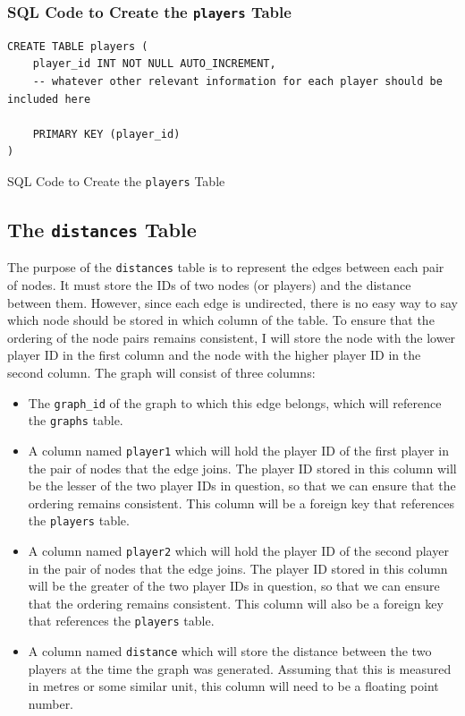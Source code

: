\documentclass[a4paper,11pt]{article}
\newenvironment{code}{\captionsetup{type=listing}}{}
\begin{document}
\subsubsection{SQL Code to Create the \texttt{players} Table}
\begin{code}
\begin{verbatim}
CREATE TABLE players (
    player_id INT NOT NULL AUTO_INCREMENT,
    -- whatever other relevant information for each player should be included here

    PRIMARY KEY (player_id)
)
\end{verbatim}
\caption{SQL Code to Create the \texttt{players} Table}
\end{code}

\subsection{The \texttt{distances} Table}
The purpose of the \texttt{distances} table is to represent the edges between each pair of nodes. 
It must store the IDs of two nodes (or players) and the distance between them. 
However, since each edge is undirected, there is no easy way to say which node should be stored in which column of the table.
To ensure that the ordering of the node pairs remains consistent, I will store the node with the lower player ID in the first column and the node with the higher player ID in the second column. 
The graph will consist of three columns:
\begin{itemize}
    \item   The \texttt{graph_id} of the graph to which this edge belongs, which will reference the \texttt{graphs} table. 

    \item   A column named \texttt{player1} which will hold the player ID of the first player in the pair of nodes that the edge joins. 
            The player ID stored in this column will be the lesser of the two player IDs in question, so that we can ensure that the ordering remains consistent.
            This column will be a foreign key that references the \texttt{players} table.

    \item   A column named \texttt{player2} which will hold the player ID of the second player in the pair of nodes that the edge joins. 
            The player ID stored in this column will be the greater of the two player IDs in question, so that we can ensure that the ordering remains consistent.
            This column will also be a foreign key that references the \texttt{players} table.

    \item   A column named \texttt{distance} which will store the distance between the two players at the time the graph was generated.
            Assuming that this is measured in metres or some similar unit, this column will need to be a floating point number.
\end{itemize}
\end{document}
